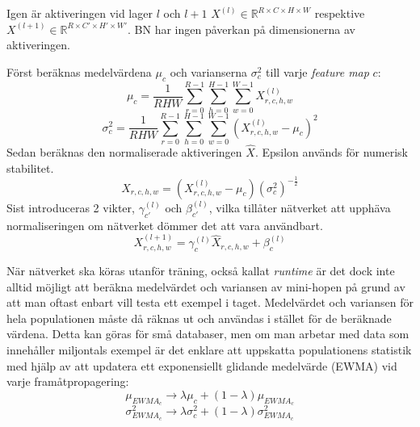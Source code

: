 \documentclass[a4paper,11pt,twoside]{article}
\begin{document}
Igen är aktiveringen vid lager $l$ och $l+1$ $X^{(l)} \in \mathbb{R}^{R \times C \times H \times W}$ respektive $X^{(l+1)} \in \mathbb{R}^{R \times C' \times H' \times W'}$. BN har ingen påverkan på dimensionerna av aktiveringen. \cite{cs231n} \cite{batchnorm}

Först beräknas medelvärdena $\mu_c$ och varianserna $\sigma^2_c$ till varje \textit{feature map} $c$: \cite{cs231n} \cite{batchnorm}
\begin{equation}
\mu_c = \frac{1}{RHW} \sum^{R-1}_{r=0} \sum^{H-1}_{h=0} \sum^{W-1}_{w=0} X^{(l)}_{r,c,h,w}
\end{equation}
\begin{equation}
\sigma^2_c  = \frac{1}{RHW} \sum^{R-1}_{r=0} \sum^{H-1}_{h=0} \sum^{W-1}_{w=0} ({X^{(l)}_{r,c,h,w} - \mu_c})^2
\end{equation}
Sedan beräknas den normaliserade aktiveringen $\hat{X}$. Epsilon används för numerisk stabilitet. \cite{cs231n} \cite{batchnorm}
\begin{equation}
\hat{X}_{r,c,h,w} = (X^{(l)}_{r,c,h,w} - \mu_c){(\sigma^2_c)}^{-\frac{1}{2}}
\end{equation}
Sist introduceras 2 vikter, $\gamma_{c'}^{(l)}$ och $\beta_{c'}^{(l)}$, vilka tillåter nätverket att upphäva normaliseringen om nätverket dömmer det att vara användbart. \cite{cs231n} \cite{batchnorm}
\begin{equation}
X^{(l+1)}_{r,c,h,w} = \gamma_{c}^{(l)} \hat{X}_{r,c,h,w} + \beta_{c}^{(l)}
\end{equation}

När nätverket ska köras utanför träning, också kallat \textit{runtime} är det dock inte alltid möjligt att beräkna medelvärdet och variansen av mini-hopen på grund av att man oftast enbart vill testa ett exempel i taget. Medelvärdet och variansen för hela populationen måste då räknas ut och användas i stället för de beräknade värdena. Detta kan göras för små databaser, men om man arbetar med data som innehåller miljontals exempel är det enklare att uppskatta populationens statistik med hjälp av att updatera ett exponensiellt glidande medelvärde (EWMA) vid varje framåtpropagering: \cite{cs231n} \cite{batchnorm}
\begin{equation}
\mu_{EWMA_c} \to \lambda \mu_c + (1-\lambda)\mu_{EWMA_c}
\end{equation}
\begin{equation}
\sigma^2_{EWMA_c} \to \lambda \sigma^2_c + (1-\lambda)\sigma^2_{EWMA_c}
\end{equation}
\end{document}
